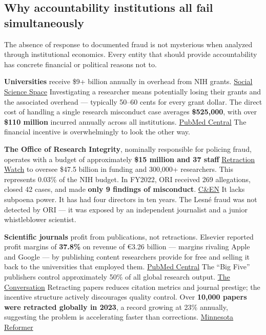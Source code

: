\subsection{Why accountability institutions all fail simultaneously}\label{19_200_billion-why-accountability-institutions-all-fail-simultaneously}

The absence of response to documented fraud is not mysterious when analyzed through institutional economics. Every entity that should provide accountability has concrete financial or political reasons not to.

\textbf{Universities} receive \$9+ billion annually in overhead from NIH grants. \href{https://www.socialsciencespace.com/2025/02/those-indirect-costs-target-by-doge-directly-support-americas-research-excellence/}{Social Science Space} Investigating a researcher means potentially losing their grants and the associated overhead --- typically 50--60 cents for every grant dollar. The direct cost of handling a single research misconduct case averages \textbf{\$525,000}, with over \textbf{\$110 million} incurred annually across all institutions. \href{https://pmc.ncbi.nlm.nih.gov/articles/PMC5206685/}{PubMed Central} The financial incentive is overwhelmingly to look the other way.

\textbf{The Office of Research Integrity}, nominally responsible for policing fraud, operates with a budget of approximately \textbf{\$15 million and 37 staff} \href{https://retractionwatch.com/wp-content/uploads/2024/03/ORI-Budget-Grew-to.pdf}{Retraction Watch} to oversee \$47.5 billion in funding and 300,000+ researchers. This represents 0.03\% of the NIH budget. In FY2022, ORI received 269 allegations, closed 42 cases, and made \textbf{only 9 findings of misconduct}. \href{https://cen.acs.org/research-integrity/US-Office-Research-Integrity-received-269-allegations-research-misconduct-last-fiscal-year/101/web/2023/02}{C\&EN} It lacks subpoena power. It has had four directors in ten years. The Lesné fraud was not detected by ORI --- it was exposed by an independent journalist and a junior whistleblower scientist.

\textbf{Scientific journals} profit from publications, not retractions. Elsevier reported profit margins of \textbf{37.8\%} on revenue of €3.26 billion --- margins rivaling Apple and Google --- by publishing content researchers provide for free and selling it back to the universities that employed them. \href{https://pmc.ncbi.nlm.nih.gov/articles/PMC6740196/}{PubMed Central} The ``Big Five'' publishers control approximately 50\% of all global research output. \href{https://theconversation.com/academic-publishing-is-a-multibillion-dollar-industry-its-not-always-good-for-science-250056}{The Conversation} Retracting papers reduces citation metrics and journal prestige; the incentive structure actively discourages quality control. Over \textbf{10,000 papers were retracted globally in 2023}, a record growing at 23\% annually, suggesting the problem is accelerating faster than corrections. \href{https://minnesotareformer.com/briefs/alzheimers-researcher-alleged-to-have-doctored-images-is-leaving-umn/}{Minnesota Reformer}

